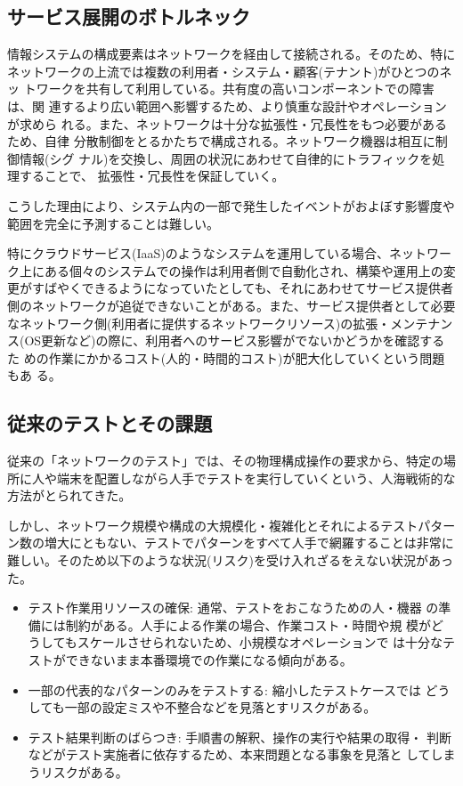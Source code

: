   \subsection{サービス展開のボトルネック}
  \label{sec:bottleneck}

情報システムの構成要素はネットワークを経由して接続される。そのため、特に
ネットワークの上流では複数の利用者・システム・顧客(テナント)がひとつのネッ
トワークを共有して利用している。共有度の高いコンポーネントでの障害は、関
連するより広い範囲へ影響するため、より慎重な設計やオペレーションが求めら
れる。また、ネットワークは十分な拡張性・冗長性をもつ必要があるため、自律
分散制御をとるかたちで構成される。ネットワーク機器は相互に制御情報(シグ
ナル)を交換し、周囲の状況にあわせて自律的にトラフィックを処理することで、
拡張性・冗長性を保証していく。

こうした理由により、システム内の一部で発生したイベントがおよぼす影響度や
範囲を完全に予測することは難しい。

特にクラウドサービス(IaaS)のようなシステムを運用している場合、ネットワー
ク上にある個々のシステムでの操作は利用者側で自動化され、構築や運用上の変
更がすばやくできるようになっていたとしても、それにあわせてサービス提供者
側のネットワークが追従できないことがある。また、サービス提供者として必要
なネットワーク側(利用者に提供するネットワークリソース)の拡張・メンテナン
ス(OS更新など)の際に、利用者へのサービス影響がでないかどうかを確認するた
めの作業にかかるコスト(人的・時間的コスト)が肥大化していくという問題もあ
る。

  \subsection{従来のテストとその課題}

従来の「ネットワークのテスト」では、その物理構成操作の要求から、特定の場
所に人や端末を配置しながら人手でテストを実行していくという、人海戦術的な
方法がとられてきた。

しかし、ネットワーク規模や構成の大規模化・複雑化とそれによるテストパター
ン数の増大にともない、テストでパターンをすべて人手で網羅することは非常に
難しい。そのため以下のような状況(リスク)を受け入れざるをえない状況があった。
\begin{itemize}
 \item テスト作業用リソースの確保: 通常、テストをおこなうための人・機器
       の準備には制約がある。人手による作業の場合、作業コスト・時間や規
       模がどうしてもスケールさせられないため、小規模なオペレーションで
       は十分なテストができないまま本番環境での作業になる傾向がある。
 \item 一部の代表的なパターンのみをテストする: 縮小したテストケースでは
       どうしても一部の設定ミスや不整合などを見落とすリスクがある。
 \item テスト結果判断のばらつき: 手順書の解釈、操作の実行や結果の取得・
       判断などがテスト実施者に依存するため、本来問題となる事象を見落と
       してしまうリスクがある。
\end{itemize}


